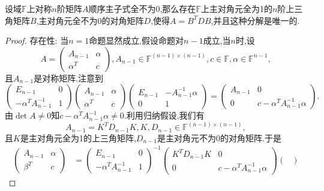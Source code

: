 \documentclass[../../main.tex]{subfiles}%
\begin{document}
\begin{theorem}\label{theorem:定理23......4654}
设域\( \mathbb{F} \)上对称\( n \)阶矩阵\( A \)顺序主子式全不为0,那么存在\( \mathbb{F} \)上主对角元全为1的\( n \)阶上三角矩阵\( B \),主对角元全不为0的对角矩阵\( D \),使得\( A = B^T D B \),并且这种分解是唯一的.
\end{theorem}
\begin{proof}

{\heiti 存在性:} 当\( n = 1 \)命题显然成立,假设命题对\( n - 1 \)成立,当\( n \)时,设
\[
A = \begin{pmatrix}
A_{n - 1} & \alpha \\
\alpha^T & c
\end{pmatrix}, A_{n - 1} \in \mathbb{F}^{(n - 1) \times (n - 1)}, c \in \mathbb{F}, \alpha \in \mathbb{F}^{n - 1},
\]
且\( A_{n - 1} \)是对称矩阵.注意到
\[
\begin{pmatrix}
E_{n - 1} & 0 \\
-\alpha^T A_{n - 1}^{-1} & 1
\end{pmatrix} \begin{pmatrix}
A_{n - 1} & \alpha \\
\alpha^T & c
\end{pmatrix} \begin{pmatrix}
E_{n - 1} & -A_{n - 1}^{-1} \alpha \\
0 & 1
\end{pmatrix} = \begin{pmatrix}
A_{n - 1} & 0 \\
0 & c - \alpha^T A_{n - 1}^{-1} \alpha
\end{pmatrix}.
\]
由\( \det A \neq 0 \)知\( c - \alpha^T A_{n - 1}^{-1} \alpha \neq 0 \).利用归纳假设,我们有
\[
A_{n - 1} = K^T D_{n - 1} K, K, D_{n - 1} \in \mathbb{F}^{(n - 1) \times (n - 1)},
\]
且\( K \)是主对角元全为1的上三角矩阵,\( D_{n - 1} \)是主对角元不为0的对角矩阵.于是
\[
\begin{aligned}
\begin{pmatrix}
A_{n - 1} & \alpha \\
\beta^T & c
\end{pmatrix} &= \begin{pmatrix}
E_{n - 1} & 0 \\
-\alpha^T A_{n - 1}^{-1} & 1
\end{pmatrix}^{-1} \begin{pmatrix}
K^T D_{n - 1} K & 0 \\
0 & c - \alpha^T A_{n - 1}^{-1} \alpha
\end{pmatrix} \begin{pmatrix}

\end{pmatrix}
\end{aligned}\]
\end{proof}
\end{document}
